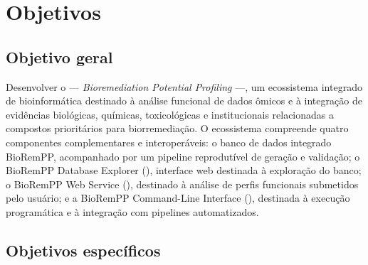 \section{Objetivos}
\label{sec:objetivos}

\subsection{Objetivo geral}

Desenvolver o \biorempp{} --- \textit{Bioremediation Potential Profiling} ---,
um ecossistema integrado de bioinformática destinado à análise funcional de
dados ômicos e à integração de evidências biológicas, químicas, toxicológicas
e institucionais relacionadas a compostos prioritários para biorremediação. O
ecossistema compreende quatro componentes complementares e interoperáveis: o
banco de dados integrado BioRemPP, acompanhado por um pipeline reprodutível de
geração e validação; o BioRemPP Database Explorer
(), interface web destinada à exploração do banco; o
BioRemPP Web Service (), destinado à análise de perfis
funcionais submetidos pelo usuário; e a BioRemPP Command-Line Interface
(), destinada à execução programática e à integração com
pipelines automatizados.

\subsection{Objetivos específicos}


